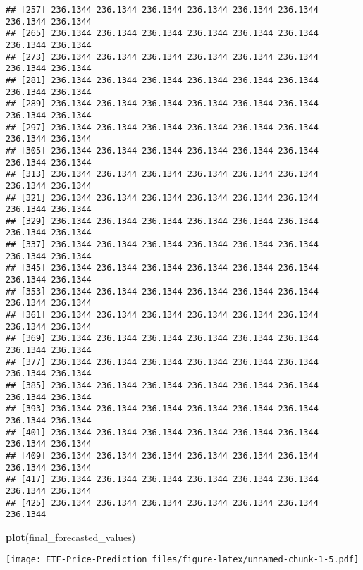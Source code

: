 \documentclass[
]{article}
\newenvironment{Shaded}{\begin{snugshade}}{\end{snugshade}}
\newcommand{\KeywordTok}[1]{\textcolor[rgb]{0.13,0.29,0.53}{\textbf{#1}}}
\newcommand{\NormalTok}[1]{#1}
\begin{document}
\begin{verbatim}
## [257] 236.1344 236.1344 236.1344 236.1344 236.1344 236.1344 236.1344 236.1344
## [265] 236.1344 236.1344 236.1344 236.1344 236.1344 236.1344 236.1344 236.1344
## [273] 236.1344 236.1344 236.1344 236.1344 236.1344 236.1344 236.1344 236.1344
## [281] 236.1344 236.1344 236.1344 236.1344 236.1344 236.1344 236.1344 236.1344
## [289] 236.1344 236.1344 236.1344 236.1344 236.1344 236.1344 236.1344 236.1344
## [297] 236.1344 236.1344 236.1344 236.1344 236.1344 236.1344 236.1344 236.1344
## [305] 236.1344 236.1344 236.1344 236.1344 236.1344 236.1344 236.1344 236.1344
## [313] 236.1344 236.1344 236.1344 236.1344 236.1344 236.1344 236.1344 236.1344
## [321] 236.1344 236.1344 236.1344 236.1344 236.1344 236.1344 236.1344 236.1344
## [329] 236.1344 236.1344 236.1344 236.1344 236.1344 236.1344 236.1344 236.1344
## [337] 236.1344 236.1344 236.1344 236.1344 236.1344 236.1344 236.1344 236.1344
## [345] 236.1344 236.1344 236.1344 236.1344 236.1344 236.1344 236.1344 236.1344
## [353] 236.1344 236.1344 236.1344 236.1344 236.1344 236.1344 236.1344 236.1344
## [361] 236.1344 236.1344 236.1344 236.1344 236.1344 236.1344 236.1344 236.1344
## [369] 236.1344 236.1344 236.1344 236.1344 236.1344 236.1344 236.1344 236.1344
## [377] 236.1344 236.1344 236.1344 236.1344 236.1344 236.1344 236.1344 236.1344
## [385] 236.1344 236.1344 236.1344 236.1344 236.1344 236.1344 236.1344 236.1344
## [393] 236.1344 236.1344 236.1344 236.1344 236.1344 236.1344 236.1344 236.1344
## [401] 236.1344 236.1344 236.1344 236.1344 236.1344 236.1344 236.1344 236.1344
## [409] 236.1344 236.1344 236.1344 236.1344 236.1344 236.1344 236.1344 236.1344
## [417] 236.1344 236.1344 236.1344 236.1344 236.1344 236.1344 236.1344 236.1344
## [425] 236.1344 236.1344 236.1344 236.1344 236.1344 236.1344 236.1344
\end{verbatim}

\begin{Shaded}
\begin{Highlighting}[]
      \KeywordTok{plot}\NormalTok{(final_forecasted_values)}
\end{Highlighting}
\end{Shaded}

\texttt{[image: ETF-Price-Prediction\_files/figure-latex/unnamed-chunk-1-5.pdf]}
\end{document}
